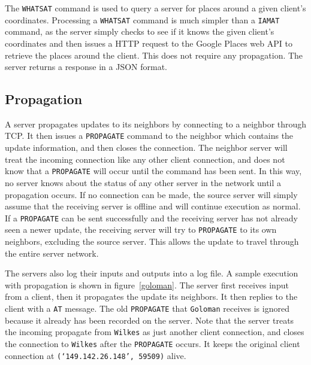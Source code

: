 \documentclass[letterpaper,twocolumn,10pt]{article}
\begin{document}
The \texttt{WHATSAT} command is used to query a server for places around a given client's coordinates. Processing a \texttt{WHATSAT}
command is much simpler than a \texttt{IAMAT} command, as the server simply checks to see if it knows the given client's coordinates and
then issues a HTTP request to the Google Places web API to retrieve the places around the client. This does not require any propagation.
The server returns a response in a JSON format.

\subsection{Propagation}

A server propagates updates to its neighbors by connecting to a neighbor through TCP. It then issues a \texttt{PROPAGATE}
command to the neighbor which contains the update information, and then closes the connection. The neighbor server will treat
the incoming connection like any other client connection, and does not know that a \texttt{PROPAGATE} will occur until the
command has been sent. In this way, no server knows about the status of any other server in the network until a propagation
occurs. If no connection can be made, the source server will simply assume that the receiving server is offline and will continue
execution as normal. If a \texttt{PROPAGATE} can be sent successfully and the receiving server has not already seen a newer update,
the receiving server will try to \texttt{PROPAGATE} to its own neighbors, excluding the source server. This allows the update to travel
through the entire server network.

The servers also log their inputs and outputs into a log file. A sample execution with propagation is shown in figure~\ref{goloman}.
The server first receives input from a client, then it propagates the update its neighbors. It then replies to the client with a \texttt{AT}
message. The old \texttt{PROPAGATE} that \texttt{Goloman} receives is ignored because it already has been recorded on the server.
Note that the server treats the incoming propagate from \texttt{Wilkes} as just another client connection, and closes the connection
to \texttt{Wilkes} after the \texttt{PROPAGATE} occurs. It keeps the original client connection at \texttt{(`149.142.26.148', 59509)} alive.
\end{document}
